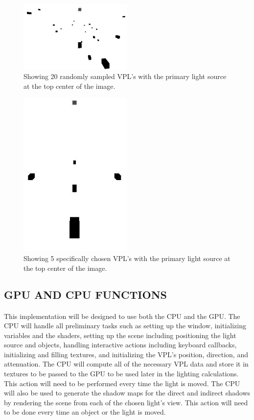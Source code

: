 \begin{figure}[h!]
  \centering
    \includegraphics[width=0.5\textwidth]{20randomVPLs.jpg}
  	\caption{Showing 20 randomly sampled VPL's with the primary light source at the top center of the image.}
	\label{fig:20randomVPLs}
\end{figure}

\begin{figure}[h!]
  \centering
    \includegraphics[width=0.5\textwidth]{5specificVPLs.jpg}
  	\caption{Showing 5 specifically chosen VPL's with the primary light source at the top center of the image.}
	\label{fig:5specificVPLs}
\end{figure}

\subsection{GPU AND CPU FUNCTIONS}
\paragraph{}
This implementation will be designed to use both the CPU and the GPU.  The CPU will handle all preliminary tasks such as setting up the window, initializing variables and the shaders, setting up the scene including positioning the light source and objects, handling interactive actions including keyboard callbacks, initializing and filling textures, and initializing the VPL's position, direction, and attenuation.  The CPU will compute all of the necessary VPL data and store it in textures to be passed to the GPU to be used later in the lighting calculations.  This action will need to be performed every time the light is moved.  The CPU will also be used to generate the shadow maps for the direct and indirect shadows by rendering the scene from each of the chosen light's view.  This action will need to be done every time an object or the light is moved.

